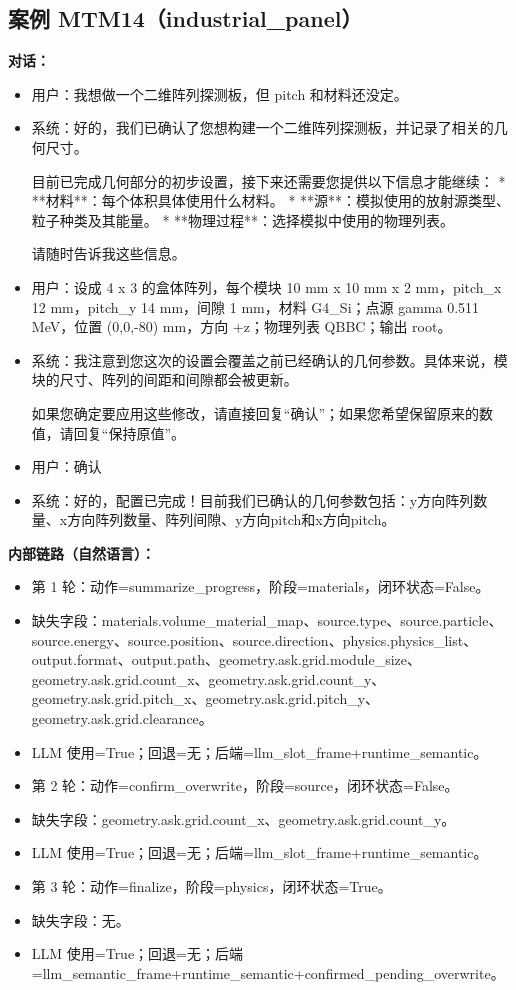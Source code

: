 \documentclass[11pt]{ctexart}
\begin{document}
\subsection{案例 MTM14（industrial\_panel）}
\textbf{对话：}
\begin{itemize}
\item 用户：我想做一个二维阵列探测板，但 pitch 和材料还没定。
\item 系统：好的，我们已确认了您想构建一个二维阵列探测板，并记录了相关的几何尺寸。

目前已完成几何部分的初步设置，接下来还需要您提供以下信息才能继续：
*   **材料**：每个体积具体使用什么材料。
*   **源**：模拟使用的放射源类型、粒子种类及其能量。
*   **物理过程**：选择模拟中使用的物理列表。

请随时告诉我这些信息。
\item 用户：设成 4 x 3 的盒体阵列，每个模块 10 mm x 10 mm x 2 mm，pitch\_x 12 mm，pitch\_y 14 mm，间隙 1 mm，材料 G4\_Si；点源 gamma 0.511 MeV，位置 (0,0,-80) mm，方向 +z；物理列表 QBBC；输出 root。
\item 系统：我注意到您这次的设置会覆盖之前已经确认的几何参数。具体来说，模块的尺寸、阵列的间距和间隙都会被更新。

如果您确定要应用这些修改，请直接回复“确认”；如果您希望保留原来的数值，请回复“保持原值”。
\item 用户：确认
\item 系统：好的，配置已完成！目前我们已确认的几何参数包括：y方向阵列数量、x方向阵列数量、阵列间隙、y方向pitch和x方向pitch。
\end{itemize}
\textbf{内部链路（自然语言）：}
\begin{itemize}
\item 第 1 轮：动作=summarize\_progress，阶段=materials，闭环状态=False。
\item 缺失字段：materials.volume\_material\_map、source.type、source.particle、source.energy、source.position、source.direction、physics.physics\_list、output.format、output.path、geometry.ask.grid.module\_size、geometry.ask.grid.count\_x、geometry.ask.grid.count\_y、geometry.ask.grid.pitch\_x、geometry.ask.grid.pitch\_y、geometry.ask.grid.clearance。
\item LLM 使用=True；回退=无；后端=llm\_slot\_frame+runtime\_semantic。
\item 第 2 轮：动作=confirm\_overwrite，阶段=source，闭环状态=False。
\item 缺失字段：geometry.ask.grid.count\_x、geometry.ask.grid.count\_y。
\item LLM 使用=True；回退=无；后端=llm\_slot\_frame+runtime\_semantic。
\item 第 3 轮：动作=finalize，阶段=physics，闭环状态=True。
\item 缺失字段：无。
\item LLM 使用=True；回退=无；后端=llm\_semantic\_frame+runtime\_semantic+confirmed\_pending\_overwrite。
\end{itemize}
\end{document}
